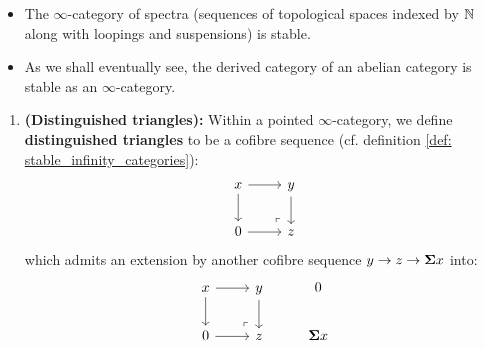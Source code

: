             \begin{example}
                \noindent
                \begin{itemize}
                    \item The $\infty$-category of spectra (sequences of topological spaces indexed by $\mathbb{N}$ along with loopings and suspensions) is stable.
                    \item As we shall eventually see, the derived category of an abelian category is stable as an $\infty$-category.
                \end{itemize}
            \end{example}
            
            \begin{definition} \label{def: triangulated_infinity_categories} 
                \noindent
                \begin{enumerate}
                    \item \textbf{(Distinguished triangles):} Within a pointed $\infty$-category, we define \textbf{distinguished triangles} to be a cofibre sequence (cf. definition \ref{def: stable_infinity_categories}):
                        $$
                            \begin{tikzcd}
                            	x & y \\
                            	0 & z
                            	\arrow[from=1-1, to=2-1]
                            	\arrow[from=1-1, to=1-2]
                            	\arrow[from=1-2, to=2-2]
                            	\arrow[from=2-1, to=2-2]
                            	\arrow["\lrcorner"{anchor=center, pos=0.125, rotate=180}, draw=none, from=2-2, to=1-1]
                            \end{tikzcd}
                        $$
                    which admits an extension by another cofibre sequence $y \to z \to \suspension x$ into:
                        $$
                            \begin{tikzcd}
                            	x & y & 0 \\
                            	0 & z & {\suspension x}
                            	\arrow[from=1-1, to=2-1]
                            	\arrow[from=1-1, to=1-2]
                            	\arrow[from=1-2, to=2-2]
                            	\arrow[from=2-1, to=2-2]
                            	\arrow["\lrcorner"{anchor=center, pos=0.125, rotate=180}, draw=none, from=2-2, to=1-1]

\end{tikzcd}$$
\end{enumerate}
\end{definition}
